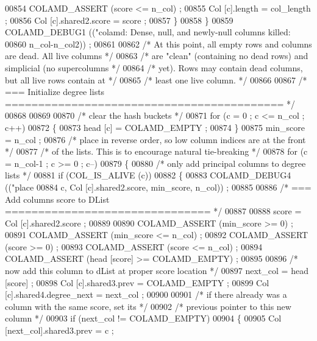 \begin{DoxyCode}
{{{{{{{{{{{{{{{00854       COLAMD\_ASSERT (score <= n\_col) ;
00855       Col [c].length = col\_length ;
00856       Col [c].shared2.score = score ;
00857     \}
00858   \}
00859   COLAMD\_DEBUG1 ((\textcolor{stringliteral}{"colamd: Dense, null, and newly-null columns killed: %
00860           n\_col-n\_col2)) ;
00861 
00862   \textcolor{comment}{/* At this point, all empty rows and columns are dead.  All live columns */}
00863   \textcolor{comment}{/* are "clean" (containing no dead rows) and simplicial (no supercolumns */}
00864   \textcolor{comment}{/* yet).  Rows may contain dead columns, but all live rows contain at */}
00865   \textcolor{comment}{/* least one live column. */}
00866 
00867   \textcolor{comment}{/* === Initialize degree lists ========================================== */}
00868 
00869 
00870   \textcolor{comment}{/* clear the hash buckets */}
00871   \textcolor{keywordflow}{for} (c = 0 ; c <= n\_col ; c++)
00872   \{
00873     head [c] = COLAMD\_EMPTY ;
00874   \}
00875   min\_score = n\_col ;
00876   \textcolor{comment}{/* place in reverse order, so low column indices are at the front */}
00877   \textcolor{comment}{/* of the lists.  This is to encourage natural tie-breaking */}
00878   \textcolor{keywordflow}{for} (c = n\_col-1 ; c >= 0 ; c--)
00879   \{
00880     \textcolor{comment}{/* only add principal columns to degree lists */}
00881     \textcolor{keywordflow}{if} (COL\_IS\_ALIVE (c))
00882     \{
00883       COLAMD\_DEBUG4 ((\textcolor{stringliteral}{"place %
00884               c, Col [c].shared2.score, min\_score, n\_col)) ;
00885 
00886       \textcolor{comment}{/* === Add columns score to DList =============================== */}
00887 
00888       score = Col [c].shared2.score ;
00889 
00890       COLAMD\_ASSERT (min\_score >= 0) ;
00891       COLAMD\_ASSERT (min\_score <= n\_col) ;
00892       COLAMD\_ASSERT (score >= 0) ;
00893       COLAMD\_ASSERT (score <= n\_col) ;
00894       COLAMD\_ASSERT (head [score] >= COLAMD\_EMPTY) ;
00895 
00896       \textcolor{comment}{/* now add this column to dList at proper score location */}
00897       next\_col = head [score] ;
00898       Col [c].shared3.prev = COLAMD\_EMPTY ;
00899       Col [c].shared4.degree\_next = next\_col ;
00900 
00901       \textcolor{comment}{/* if there already was a column with the same score, set its */}
00902       \textcolor{comment}{/* previous pointer to this new column */}
00903       \textcolor{keywordflow}{if} (next\_col != COLAMD\_EMPTY)
00904       \{
00905     Col [next\_col].shared3.prev = c ;
}}}}}}}}}}}}}}}}}
\end{DoxyCode}
